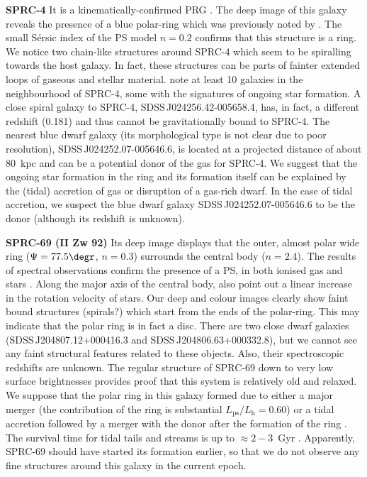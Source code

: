 \documentclass{raa}
\begin{document}
{\bf SPRC-4}
It is a kinematically-confirmed PRG \citep{2014ASPC..486...71M}. The deep image of this galaxy reveals the presence of a blue polar-ring which was previously noted by \citet{fink2012}. 
The small S\'ersic index of the PS model $n=0.2$ confirms that this structure is a ring. We notice two chain-like structures around SPRC-4 which seem to be spiralling towards the host galaxy. In fact, these structures can be parts of fainter extended loops of gaseous and stellar material.  
\citet{fink2012} note at least 10 galaxies in the neighbourhood of SPRC-4, some with the signatures of ongoing star formation. 
A close spiral galaxy to SPRC-4, SDSS\,J024256.42-005658.4, has, in fact, a different redshift (0.181) and thus cannot be gravitationally bound to SPRC-4.
The nearest blue dwarf galaxy (its morphological type is not clear due to poor resolution), SDSS\,J024252.07-005646.6, is located at a projected distance of about 80~kpc and can be a potential donor of the gas for SPRC-4.
 We suggest that the ongoing star formation in the ring and its formation itself can be explained by the (tidal) accretion of gas or disruption of a gas-rich dwarf. In the case of tidal accretion, we suspect the blue dwarf galaxy SDSS\,J024252.07-005646.6 to be the donor (although its redshift is unknown).
 
{\bf SPRC-69 (II Zw 92) } 
Its deep image displays that the outer, almost polar wide ring ($\Psi=77.5\degr$, $n=0.3$) surrounds the central body ($n=2.4$). The results of spectral observations confirm the presence of a PS, in both ionised gas and stars \citep{moiseev2011}. Along the major axis of the central body, \citet{moiseev2011} also point out a linear increase in the rotation velocity of stars. Our deep and colour images clearly show faint bound structures (spirals?) which start from the ends of the polar-ring. This may indicate that the polar ring is in fact a disc. There are two close dwarf galaxies (SDSS\,J204807.12+000416.3 and SDSS\,J204806.63+000332.8), but we cannot see any faint structural features related to these objects. Also, their spectroscopic redshifts are unknown. The regular structure of SPRC-69 down to very low surface brightnesses provides proof that this system is relatively old and relaxed. We suppose that the polar ring in this galaxy formed due to either a major merger (the contribution of the ring is substantial $L_\mathrm{ps}/L_\mathrm{h}=0.60$) or a tidal accretion followed by a merger with the donor after the formation of the ring \citep{rs1997,bourcomb2003}. The survival time for tidal tails and streams is up to $\approx2-3$~Gyr \citep{2019A&A...632A.122M,2020A&A...640A..38R}. Apparently, SPRC-69 should have started its formation earlier, so that we do not observe any fine structures around this galaxy in the current epoch.
\end{document}
